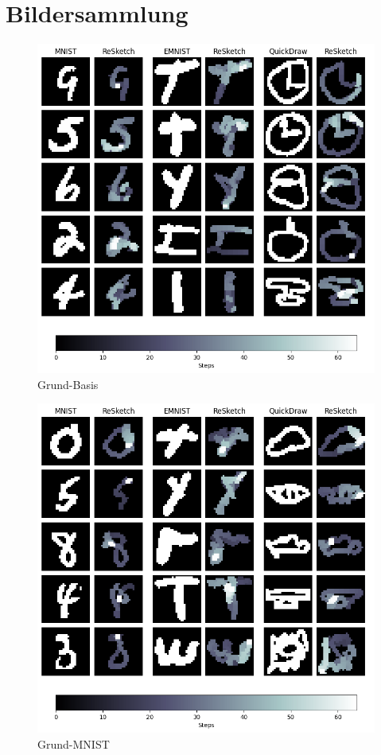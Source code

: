 \section{Bildersammlung}
\label{chap:r_bild}
\begin{figure}[!ht]
    \centering
    \includegraphics[width=\textwidth]{images/resultate/base-base.png}
    \caption{Grund-Basis}
    \label{fig:Grund-Basis}
\end{figure}

\begin{figure}[!ht]
    \centering
    \includegraphics[width=\textwidth]{images/resultate/base-mnist.png}
    \caption{Grund-MNIST}
    \label{fig:Grund-MNIST}
\end{figure}

